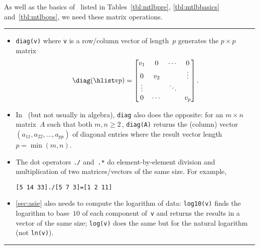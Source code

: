 \begin{table}
\caption{As well as the basics of \script\ listed in Tables~\ref{tbl:mtlbpre}, \ref{tbl:mtlbbasics} and~\ref{tbl:mtlbops},  we need these matrix operations.} \label{tbl:mtlbmops}
\hrule
\begin{minipage}{\linewidth}
\begin{itemize}
\item {}\verb|diag(v)| where \verb|v| is a row/column vector of length~\(p\) generates the \(p\times p\) matrix 
\begin{equation*}
\diag(\hlist vp)=\begin{bmatrix} v_1&0&\cdots&0\\
0&v_2&&\vdots\\ \vdots&&\ddots\\ 0&\cdots&&v_p \end{bmatrix}.
\end{equation*}

\item In \script\ (but not usually in algebra), \verb|diag| also does the opposite: for an \(m\times n\) matrix~\(A\) such that both \(m,n\geq2\)\,,  \verb|diag(A)| returns the (column) vector \((a_{11},a_{22},\ldots,a_{pp})\) of diagonal entries where the result vector length \(p=\min(m,n)\).

\item The dot operators \verb|./| and~\verb|.*| do element-by-element division and multiplication of two matrices\slash vectors of the same size.  For example, 
\begin{verbatim}
[5 14 33]./[5 7 3]=[1 2 11]
\end{verbatim}


\item \autoref{sec:asie} also needs to compute the logarithm of data: \verb|log10(v)| finds the logarithm to base~\(10\) of each component of~\verb|v| and returns the results in a vector of the same size; \verb|log(v)| does the same but for the natural logarithm (not \verb|ln(v)|).

\end{itemize}
\end{minipage}
\hrule
\end{table}




